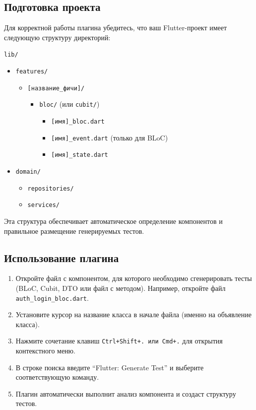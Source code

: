 \documentclass[14pt, russian]{scrartcl}
\newcommand{\enq}[1]{\enquote{#1}}
\begin{document}
\subsection{Подготовка проекта}

Для корректной работы плагина убедитесь, что ваш Flutter-проект имеет следующую структуру директорий:

\texttt{lib/}
\begin{itemize}
    \item \texttt{features/}
    \begin{itemize}
        \item \texttt{[название\_фичи]/}
        \begin{itemize}
            \item \texttt{bloc/} (или \texttt{cubit/})
            \begin{itemize}
                \item \texttt{[имя]\_bloc.dart}
                \item \texttt{[имя]\_event.dart} (только для BLoC)
                \item \texttt{[имя]\_state.dart}
            \end{itemize}
        \end{itemize}
    \end{itemize}
    \item \texttt{domain/}
    \begin{itemize}
        \item \texttt{repositories/}
        \item \texttt{services/}
    \end{itemize}
\end{itemize}

Эта структура обеспечивает автоматическое определение компонентов и правильное размещение генерируемых тестов.

\subsection{Использование плагина}

\begin{enumerate}
    \item Откройте файл с компонентом, для которого необходимо сгенерировать тесты (BLoC, Cubit, DTO или файл с методом). Например, откройте файл \texttt{auth\_login\_bloc.dart}.
    \item Установите курсор на название класса в начале файла (именно на объявление класса).
    \item Нажмите сочетание клавиш \texttt{Ctrl+Shift+. или Cmd+.} для открытия контекстного меню.
    \item В строке поиска введите \enq{Flutter: Generate Test} и выберите соответствующую команду.
    \item Плагин автоматически выполнит анализ компонента и создаст структуру тестов.
\end{enumerate}
\end{document}
